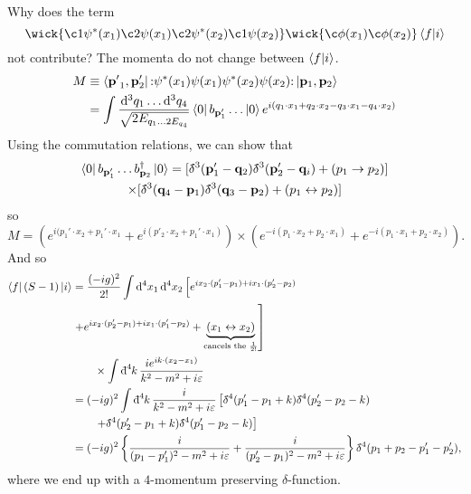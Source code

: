 
Why does the term
\begin{equation}
  \wick{\c1 \psi^*(x_1) \c2 \psi(x_1) \c2 \psi^*(x_2) \c1 \psi(x_2)}\wick{\c \phi(x_1) \c\phi(x_2)} \bra{f}\ket{i}
\end{equation}
not contribute?
The momenta do not change between $\bra{f}\ket{i}$.
\begin{align}
  M &\equiv \bra{\vb{p'}_1, \vb{p}_2'} \mathop{:}\nolimits\!\psi^*(x_1) \psi(x_1) \psi^*(x_2) \psi(x_2)\!\mathop{:}\nolimits \ket{\vb{p}_1, \vb{p}_2}  \\
    &= \int \frac{\dd[3]{q_1} \dots \dd[3]{q_4}}{\sqrt{2 E_{q_{1} \dots 2 E_{q_4}}}} \bra{0} b_{\vb{p}_1'} \dots \ket{0} e^{i(q_1 \cdot x_1 + q_2 \cdot x_2 - q_3 \cdot x_1 - q_4 \cdot x_2)}
\end{align}
Using the commutation relations, we can show that
\begin{multline}
  \bra{0} b_{\vb{p}_1'} \dots b^{\dagger}_{\vb{p}_2} \ket{0} = [\delta\hspace*{-0.2em}\bar{}\hspace*{0.2em}^3(\vb{p}_1' - \vb{q}_2) \delta\hspace*{-0.2em}\bar{}\hspace*{0.2em}^3(\vb{p}_2' - \vb{q}_i) + (p_1 \to p_2) ] \\
  \times [\delta\hspace*{-0.2em}\bar{}\hspace*{0.2em}^3(\vb{q}_4 - \vb{p}_1) \delta\hspace*{-0.2em}\bar{}\hspace*{0.2em}^3(\vb{q}_3 - \vb{p}_2) + (p_1 \leftrightarrow p_2)]
\end{multline}
so 
\begin{equation}
  M = \left( e^{i(p_1' \cdot x_2 + p_1' \cdot x_1}  + e^{i(p'_2 \cdot x_2 + p_1' \cdot x_1) }\right) \times \left( e^{-i(p_1 \cdot x_2 + p_2 \cdot x_1)} + e^{-i (p_1 \cdot x_1 + p_2 \cdot x_2)} \right).
\end{equation}
And so 
\begin{align}
  \bra{f} (S-1) \ket{i} &= \frac{(-ig)^2}{2!} \int \dd[4]{x_1} \dd[4]{x_2} \left[ e^{i x_2 \cdot (p_1' - p_1) + i x_1 \cdot (p_2' - p_2)}  \right. \\
			& \left. + e^{i x_2 \cdot (p_2' - p_1) + i x_1 \cdot (p_1' -p_2)} + \underbrace{(x_1 \leftrightarrow x_2)}_{\text{cancels the } \frac{1}{2!}}\right] \\
			& \qquad \times \int \bdd[4]{k} \frac{i e^{ik \cdot (x_2 - x_1)}}{k^2 - m^2 + i \varepsilon} \\
			&= (-ig)^2 \int \bdd[4]{k} \frac{i}{k^2 - m^2 + i \varepsilon} \left[ \bdelta^4(p_1' - p_1 + k) \bdelta^4(p_2' - p_2 - k) \right. \\
			& \qquad \left. + \bdelta^4(p_2' - p_1 + k) \bdelta^4(p_1' - p_2 - k) \right] \\
			&= (-ig)^2 \left\{ \frac{i}{(p_1 - p_1')^2 - m^2 + i \varepsilon} + \frac{i}{(p_2' - p_1)^2 - m^2 + i\varepsilon} \right\} \bdelta^4(p_1 + p_2 - p_1' - p_2'),
			\label{eq:result}
\end{align} 
where we end up with a $4$-momentum preserving $\delta$-function.

